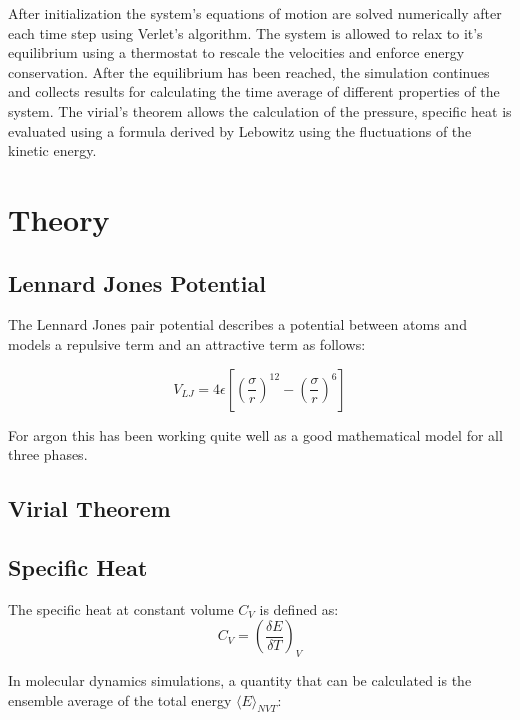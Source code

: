 \documentclass[
10pt, %
a4paper, %
oneside, %
headinclude,footinclude, %
BCOR5mm, %
]{scrartcl}
\begin{document}
After initialization the system's equations of motion are solved numerically after each time step using Verlet's algorithm. The system is allowed to relax to it's equilibrium using a thermostat to rescale the velocities and enforce energy conservation. After the equilibrium has been reached, the simulation continues and collects results for calculating the time average of different properties of the system. The virial's theorem allows the calculation of the pressure, specific heat is evaluated using a formula derived by Lebowitz using the fluctuations of the kinetic energy\cite{Duane:1985lz}.

 
\newpage

\section{Theory}

\subsection{Lennard Jones Potential}

The Lennard Jones pair potential describes a potential between atoms and models a repulsive term and an attractive term as follows:

$$ V_{LJ} =  4 \epsilon \left [ \left (\frac{\sigma}{r} \right )^{12} - \left ( \frac{\sigma}{r} \right )^6 \right ] $$

For argon this has been working quite well as a good mathematical model for all three phases\cite{Rahman}. 
 

\subsection{Virial Theorem}

\subsection{Specific Heat}

The specific heat at constant volume $C_V$  is defined as:
$$ C_V = \left ( \frac{\delta E}{\delta T} \right )_V $$

\noindent
In molecular dynamics simulations, a quantity that can be calculated is the ensemble average of the total energy $\langle E\rangle_{NVT}$:
\end{document}
